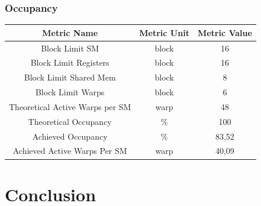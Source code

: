 \documentclass[a4paper, 12pt, oneside]{article}
\begin{document}
\subsubsection{Occupancy}

\begin{center}
  \begin{tabular}{ |c|c|c| }
    \hline
    Metric Name                     & Metric Unit & Metric Value \\
    \hline
    Block Limit SM                  & block       & 16           \\
    Block Limit Registers           & block       & 16           \\
    Block Limit Shared Mem          & block       & 8            \\
    Block Limit Warps               & block       & 6            \\
    Theoretical Active Warps per SM & warp        & 48           \\
    Theoretical Occupancy           & \%          & 100          \\
    Achieved Occupancy              & \%          & 83,52        \\
    Achieved Active Warps Per SM    & warp        & 40,09        \\
    \hline
  \end{tabular}
\end{center}

\section{Conclusion}


\printbibliography
\end{document}
